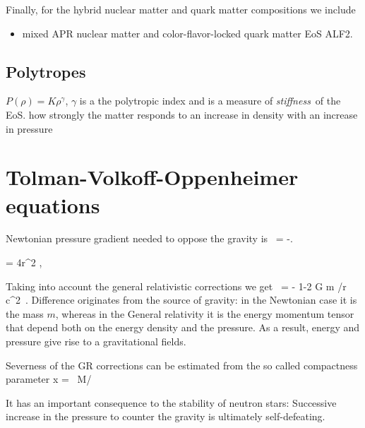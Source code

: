 Finally, for the hybrid nuclear matter and quark matter compositions \quark we include 
\begin{itemize}
    \item mixed APR nuclear matter and color-flavor-locked quark matter EoS ALF2.\cite{ALF}
\end{itemize}




\subsection{Polytropes}

$P(\rho) = K \rho^{\gamma}$, $\gamma$ is a the polytropic index and is a measure of \emph{stiffness} of the EoS.
how strongly the matter responds to an increase in density with an increase in pressure





\section{Tolman-Volkoff-Oppenheimer equations}
Newtonian pressure gradient needed to oppose the gravity is
\be
{} = -.
\ee

\be
{} = 4\pi r^2 \rho,
\ee

Taking into account the general relativistic corrections we get
\be
{} = 
    - \times 
    {1-2 G m /r c^2 }.
\ee
Difference originates from the source of gravity:
in the Newtonian case it is the mass $m$, whereas in the General relativity it is the energy momentum tensor that depend both on the energy density and the pressure.
As a result, energy and pressure give rise to a gravitational fields.

Severness of the GR corrections can be estimated from the so called compactness parameter
\be
x =  ~M/\Msun \km
\ee


It has an important consequence to the stability of neutron stars:
Successive increase in the pressure to counter the gravity is ultimately self-defeating.



